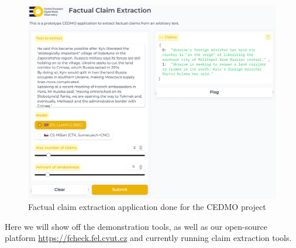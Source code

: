 \begin{figure}
    \includegraphics[width=16cm]{fig/cedmo.pdf}
    \caption{Factual claim extraction application done for the CEDMO project}
    \label{fig:framework}
\end{figure}

Here we will show off the demonstration tools, as well as our open-source platform \url{https://fcheck.fel.cvut.cz} and currently running claim extraction tools. 